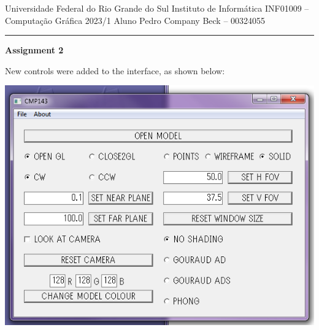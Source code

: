 \documentclass[12pt]{article}
\begin{document}
\noindent
Universidade Federal do Rio Grande do Sul \hfill Instituto de Informática \newline 
INF01009 -- Computação Gráfica \hfill 2023/1 \newline
Aluno \hfill Pedro Company Beck -- 00324055
\rule{\linewidth}{1.pt}

\begin{center}
	\LARGE\textbf{Assignment 2} 
\end{center}

New controls were added to the interface, as shown below: 
\begin{center}
\includegraphics[scale=0.5]{1.png}
\end{center}
\end{document}
